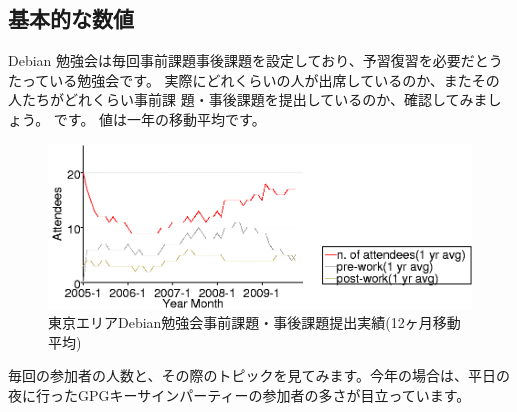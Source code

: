 \documentclass[mingoth,a4paper]{jsarticle}
\begin{document}
\subsection{基本的な数値}

Debian 勉強会は毎回事前課題事後課題を設定しており、予習復習を必要だとう
たっている勉強会です。
実際にどれくらいの人が出席しているのか、またその人たちがどれくらい事前課
題・事後課題を提出しているのか、確認してみましょう。
です。
値は一年の移動平均です。

\begin{figure}[ht]
 \includegraphics[width=1\hsize]{image200912/memberanalysis/attend.png}
\caption{東京エリアDebian勉強会事前課題・事後課題提出実績(12ヶ月移動平均)}\label{fig:attendandprepostwork}
\end{figure}

毎回の参加者の人数と、その際のトピックを見てみます。今年の場合は、平日の
夜に行ったGPGキーサインパーティーの参加者の多さが目立っています。
 
\end{document}
